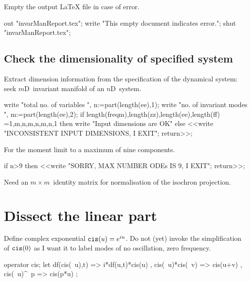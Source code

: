 \documentclass[11pt,a5paper]{article}
\begin{document}

Empty the output LaTeX file in case of error.
\begin{reduce}
out "invarManReport.tex";
write "This empty document indicates error.";
shut "invarManReport.tex";
\end{reduce}


 


\subsection{Check the dimensionality of specified system}
Extract dimension information from the specification of the
dynamical system: seek $m$D~invariant manifold of an
$n$D~system.
\begin{reduce}
write "total no. of variables ",
n:=part(length(ee),1);
write "no. of invariant modes ",
m:=part(length(ee),2);
if {length(freqm),length(zz),length(ee),length(ff)}
  ={{1,m},{n,m},{n,m},{n,1}} 
  then write "Input dimensions are OK" 
  else <<write "INCONSISTENT INPUT DIMENSIONS, I EXIT"; 
      return>>;
\end{reduce}

For the moment limit to a maximum of nine components.
\begin{reduce}
if n>9 then <<write "SORRY, MAX NUMBER ODEs IS 9, I EXIT"; 
    return>>;
\end{reduce}

Need an \(m\times m\)~identity matrix for normalisation of
the isochron projection.


\section{Dissect the linear part}

Define complex exponential $\verb|cis|(u)=e^{iu}$. Do not
(yet) invoke the simplification of $\verb|cis|(0)$ as I want
it to label modes of no oscillation, zero frequency.
\begin{reduce}
operator cis;
let { df(cis(~u),t) => i*df(u,t)*cis(u)
    , cis(~u)*cis(~v) => cis(u+v)
    , cis(~u)^~p => cis(p*u)
    };
\end{reduce}
\end{document}
